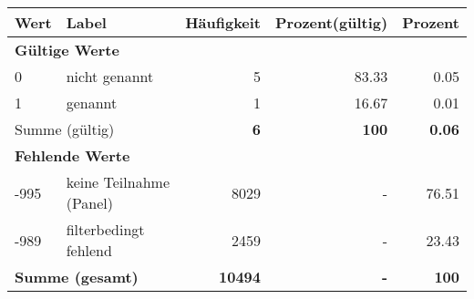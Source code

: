      \begin{longtable}{lXrrr}
     \toprule
     \textbf{Wert} & \textbf{Label} & \textbf{Häufigkeit} & \textbf{Prozent(gültig)} & \textbf{Prozent} \\
     \endhead
     \midrule
     \multicolumn{5}{l}{\textbf{Gültige Werte}}\\

     0 &
     \multicolumn{1}{X}{ nicht genannt   } &


       \num{5} &
       \num[round-mode=places,round-precision=2]{83,33} &
         \num[round-mode=places,round-precision=2]{0,05} \\

     1 &
     \multicolumn{1}{X}{ genannt   } &


       \num{1} &
       \num[round-mode=places,round-precision=2]{16,67} &
         \num[round-mode=places,round-precision=2]{0,01} \\
     \midrule
     \multicolumn{2}{l}{Summe (gültig)} &
       \textbf{\num{6}} &
     \textbf{100} &
       \textbf{\num[round-mode=places,round-precision=2]{0,06}} \\
     \multicolumn{5}{l}{\textbf{Fehlende Werte}}\\
       -995 &
       keine Teilnahme (Panel) &
         \num{8029} &
        - &
         \num[round-mode=places,round-precision=2]{76,51} \\
       -989 &
       filterbedingt fehlend &
         \num{2459} &
        - &
         \num[round-mode=places,round-precision=2]{23,43} \\
     \midrule
     \multicolumn{2}{l}{\textbf{Summe (gesamt)}} &
          \textbf{\num{10494}} &
        \textbf{-} &
        \textbf{100} \\
     \bottomrule
     \end{longtable}
     
